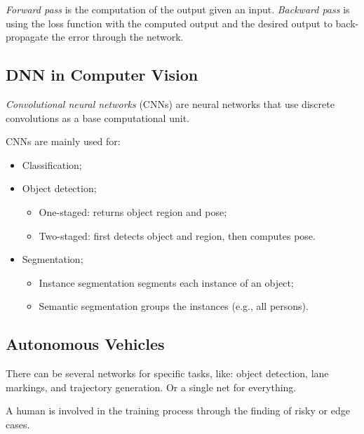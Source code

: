 \documentclass[a4paper]{report}
\begin{document}
\begin{note}
    \emph{Forward pass} is the computation of the output given an input.
    \emph{Backward pass} is using the loss function with the computed output and the desired output to back-propagate the error through the network.
\end{note}

\subsection*{DNN in Computer Vision}

\begin{definition}
    \emph{Convolutional neural networks} (CNNs) are neural networks that use discrete convolutions as a base computational unit.
\end{definition}

\begin{note}
    CNNs are mainly used for:
    \begin{itemize}
        \item Classification;
	\item Object detection;
	    \begin{itemize}
	        \item One-staged: returns object region and pose;
		\item Two-staged: first detects object and region, then computes pose.
	    \end{itemize}
	\item Segmentation;
	    \begin{itemize}
	        \item Instance segmentation segments each instance of an object;
		\item Semantic segmentation groups the instances (e.g., all persons).
	    \end{itemize}
    \end{itemize}
\end{note}

\subsection*{Autonomous Vehicles}

There can be several networks for specific tasks, like: object detection, lane markings, and trajectory generation. Or a single net for everything.

A human is involved in the training process through the finding of risky or edge cases.
\end{document}
